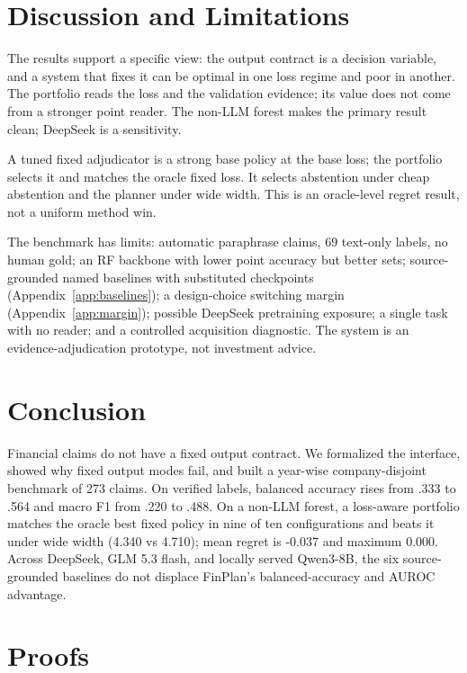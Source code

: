 \documentclass[11pt]{article}
\begin{document}
\section{Discussion and Limitations}
The results support a specific view: the output contract is a decision variable, and a system that fixes it can be optimal in one loss regime and poor in another. The portfolio reads the loss and the validation evidence; its value does not come from a stronger point reader. The non-LLM forest makes the primary result clean; DeepSeek is a sensitivity.

A tuned fixed adjudicator is a strong base policy at the base loss; the portfolio selects it and matches the oracle fixed loss. It selects abstention under cheap abstention and the planner under wide width. This is an oracle-level regret result, not a uniform method win.

The benchmark has limits: automatic paraphrase claims, 69 text-only labels, no human gold; an RF backbone with lower point accuracy but better sets; source-grounded named baselines with substituted checkpoints (Appendix~\ref{app:baselines}); a design-choice switching margin (Appendix~\ref{app:margin}); possible DeepSeek pretraining exposure; a single task with no reader; and a controlled acquisition diagnostic. The system is an evidence-adjudication prototype, not investment advice.

\section{Conclusion}
Financial claims do not have a fixed output contract. We formalized the interface, showed why fixed output modes fail, and built a year-wise company-disjoint benchmark of 273 claims. On verified labels, balanced accuracy rises from .333 to .564 and macro F1 from .220 to .488. On a non-LLM forest, a loss-aware portfolio matches the oracle best fixed policy in nine of ten configurations and beats it under wide width (4.340 vs 4.710); mean regret is -0.037 and maximum 0.000. Across DeepSeek, GLM 5.3 flash, and locally served Qwen3-8B, the six source-grounded baselines do not displace FinPlan's balanced-accuracy and AUROC advantage.



\appendix

\section{Proofs}
\label{app:proofs}
\end{document}
